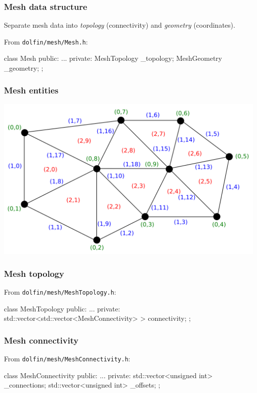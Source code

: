 \documentclass{fenicscourse}
\begin{document}
\begin{frame}[fragile]
  \frametitle{Mesh data structure}

  Separate mesh data into \emph{topology} (connectivity)
  and \emph{geometry} (coordinates).

  \bigskip

  From \texttt{dolfin/mesh/Mesh.h}:

\begin{c++}
class Mesh
{
public:
  ...
private:
  MeshTopology _topology;
  MeshGeometry _geometry;
};
\end{c++}

\end{frame}

\begin{frame}
  \frametitle{Mesh entities}
  \includegraphics[width=\textwidth]{png/mesh_entities.png}
\end{frame}

\begin{frame}[fragile]
  \frametitle{Mesh topology}

  \bigskip

  From \texttt{dolfin/mesh/MeshTopology.h}:

  \bigskip

\begin{c++}
class MeshTopology
{
public:
  ...
private:
    std::vector<std::vector<MeshConnectivity> > connectivity;
};
\end{c++}

\end{frame}

\begin{frame}[fragile]
  \frametitle{Mesh connectivity}

  \bigskip

  From \texttt{dolfin/mesh/MeshConnectivity.h}:

  \bigskip

\begin{c++}
class MeshConnectivity
{
public:
  ...
private:
    std::vector<unsigned int> _connections;
    std::vector<unsigned int> _offsets;
};
\end{c++}

\end{frame}
\end{document}
